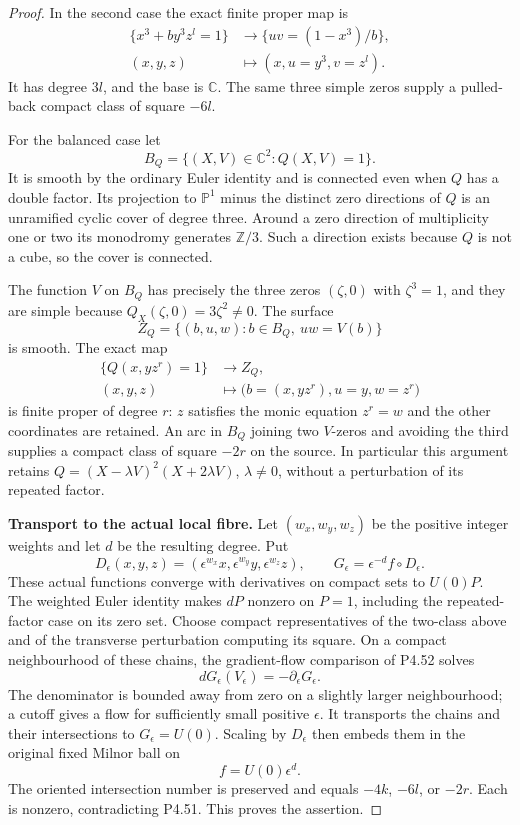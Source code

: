 \begin{proof}
In the second case the exact finite proper map is
\[
 \begin{split}
 \{x^3+b y^3z^l=1\}&\longrightarrow
                 \{uv=(1-x^3)/b\},\\
 (x,y,z)&\longmapsto(x,u=y^3,v=z^l).
 \end{split}
\]
It has degree $3l$, and the base is $\mathbb C$.
The same three simple zeros supply a pulled-back
compact class of square $-6l$.

For the balanced case let
\[
                 B_Q=\{(X,V)\in\mathbb C^2:Q(X,V)=1\}.
\]
It is smooth by the ordinary Euler identity and is
connected even when $Q$ has a double factor. Its
projection to $\mathbb P^1$ minus the distinct zero
directions of $Q$ is an unramified cyclic cover of
degree three. Around a zero direction of multiplicity
one or two its monodromy generates $\mathbb Z/3$.
Such a direction exists because $Q$ is not a cube,
so the cover is connected.

The function $V$ on $B_Q$ has precisely the three
zeros $(\zeta,0)$ with $\zeta^3=1$, and they are
simple because $Q_X(\zeta,0)=3\zeta^2\ne0$.
The surface
\[
             Z_Q=\{(b,u,w):b\in B_Q,\ uw=V(b)\}
\]
is smooth. The exact map
\[
 \begin{split}
       \{Q(x,yz^r)=1\}&\longrightarrow Z_Q,\\
       (x,y,z)&\longmapsto
                    \bigl(b=(x,yz^r),u=y,w=z^r\bigr)
 \end{split}                                                   \tag{R19.5}
\]
is finite proper of degree $r$: $z$ satisfies the
monic equation $z^r=w$ and the other coordinates are
retained. An arc in $B_Q$ joining two $V$-zeros and
avoiding the third supplies a compact class of square
$-2r$ on the source. In particular this argument
retains $Q=(X-\lambda V)^2(X+2\lambda V)$,
$\lambda\ne0$, without a perturbation of its
repeated factor.

\par\medskip\noindent\textbf{Transport to the actual local fibre.}
Let $(w_x,w_y,w_z)$ be the positive integer weights
and let $d$ be the resulting degree. Put
\[
 D_\epsilon(x,y,z)=
       (\epsilon^{w_x}x,\epsilon^{w_y}y,\epsilon^{w_z}z),
 \qquad
 G_\epsilon=\epsilon^{-d}f\circ D_\epsilon.
\]
These actual functions converge with derivatives on
compact sets to $U(0)P$. The weighted Euler identity
makes $dP$ nonzero on $P=1$, including the repeated-factor
case on its zero set. Choose compact representatives
of the two-class above and of the transverse
perturbation computing its square. On a compact
neighbourhood of these chains, the gradient-flow
comparison of P4.52 solves
\[
       dG_\epsilon(V_\epsilon)
                         =-\partial_\epsilon G_\epsilon.
\]
The denominator is bounded away from zero on a
slightly larger neighbourhood; a cutoff gives a
flow for sufficiently small positive $\epsilon$.
It transports the chains and their intersections
to $G_\epsilon=U(0)$. Scaling by $D_\epsilon$ then
embeds them in the original fixed Milnor ball on
\[
                         f=U(0)\epsilon^d.
\]
The oriented intersection number is preserved and
equals $-4k$, $-6l$, or $-2r$. Each is nonzero,
contradicting P4.51. This proves the assertion.
\end{proof}

